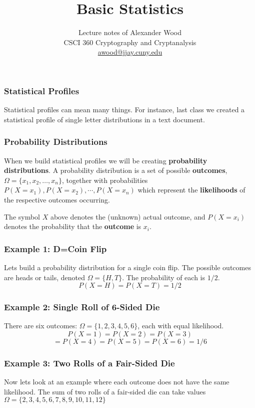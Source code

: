 \documentclass{beamer}
\title[CSCI360]{Basic Statistics}
\author
{Lecture notes of Alexander Wood \\ CSCI 360 Cryptography and Cryptanalysis \\ \scriptsize \href{mailto:awood@jjay.cuny.edu}{awood@jjay.cuny.edu}}
\institute[JJay]{John Jay College of Criminal Justice}
\date{}
\newcommand{\<}{\langle}
\renewcommand{\>}{\rangle}
\begin{document}

\begin{frame}
  \titlepage
\end{frame}


\begin{frame}
\frametitle{Statistical Profiles}

Statistical profiles can mean many things. For instance, last class we created a statistical profile of single letter distributions in a text document. 
\end{frame}

\begin{frame}
\frametitle{Probability Distributions}

When we build statistical profiles we will be creating \textbf{probability distributions}. A probability distribution is a set of possible \textbf{outcomes}, $\Omega = \{x_1, x_2, \dots, x_n\}$, together with probabilities $P(X = x_1), P(X = x_2), \cdots, P(X = x_n)$ which represent the \textbf{likelihoods} of the respective outcomes occurring.\newline

The symbol $X$ above denotes the (unknown) actual outcome, and $P(X=x_i)$ denotes the probability that the \textbf{outcome} is $x_i$. 
\end{frame}

\begin{frame}
\frametitle{Example 1: D=Coin Flip}

Lets build a probability distribution for a single coin flip. The possible outcomes are heads or tails, denoted $\Omega = \{H,T\}$. The probability of each is $1/2$.
\[
P(X = H) = P(X = T) = 1/2
\]
\end{frame}

\begin{frame}
\frametitle{Example 2: Single Roll of 6-Sided Die}

There are six outcomes: $\Omega = \{1, 2, 3, 4, 5, 6\}$, each with equal likelihood.
\[
P(X = 1) = P(X = 2) = P(X = 3) 
\]
\[
= P(X = 4) = P(X = 5) = P(X = 6) = 1/6
\]
\end{frame}


\begin{frame}
\frametitle{Example 3: Two Rolls of a Fair-Sided Die}

Now lets look at an example where each outcome does not have the same likelihood. The sum of two rolls of a fair-sided die can take values $\Omega = \{2,3,4,5,6,7,8,9,10,11,12\}$\newline
\end{frame}
\end{document}

